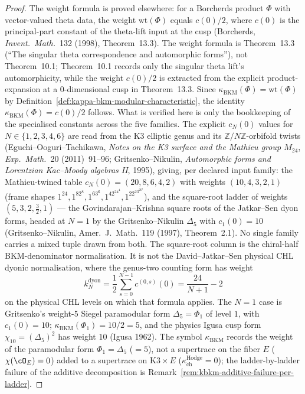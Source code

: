 \begin{proof}
The weight formula is proved elsewhere: for a Borcherds product
$\Phi$ with vector-valued theta data, the weight $\mathrm{wt}(\Phi)$
equals $c(0)/2$, where $c(0)$ is the principal-part constant of the
theta-lift input at the cusp (Borcherds, \emph{Invent.\ Math.}~132
(1998), Theorem~13.3). The weight formula is Theorem~13.3 (``The
singular theta correspondence and automorphic forms''), not
Theorem~10.1; Theorem~10.1 records only the singular theta lift's
automorphicity, while the weight $c(0)/2$ is extracted from the
explicit product-expansion at a $0$-dimensional cusp in Theorem~13.3.
Since $\kappa_{\mathrm{BKM}}(\Phi) = \mathrm{wt}(\Phi)$ by
Definition~\ref{def:kappa-bkm-modular-characteristic}, the identity
$\kappa_{\mathrm{BKM}}(\Phi) = c(0)/2$ follows. What is verified
here is only the bookkeeping of the specialised constants across the
five families. The explicit $c_N(0)$ values for
$N \in \{1, 2, 3, 4, 6\}$ are read from the K$3$ elliptic genus and its
$\mathbb{Z}/N\mathbb{Z}$-orbifold twists (Eguchi--Ooguri--Tachikawa,
\emph{Notes on the K3 surface and the Mathieu group $M_{24}$},
\emph{Exp.\ Math.}~20 (2011)~91--96; Gritsenko--Nikulin,
\emph{Automorphic forms and Lorentzian Kac--Moody algebras II}, 1995),
giving, per declared input family: the Mathieu-twined table
$c_N(0) = (20, 8, 6, 4, 2)$ with weights $(10, 4, 3, 2, 1)$ (frame
shapes $1^{24}, 1^82^8, 1^63^6, 1^42^24^4, 1^22^23^26^2$), and the
square-root ladder of weights $(5, 3, 2, \tfrac32, 1)$ --- the
Govindarajan--Krishna square roots of the Jatkar--Sen dyon forms,
headed at $N = 1$ by the Gritsenko--Nikulin $\Delta_5$ with
$c_1(0) = 10$ (Gritsenko--Nikulin, Amer.~J.~Math.~119 (1997),
Theorem~2.1). No single family carries a mixed tuple drawn from both.
The square-root column is the chiral-half BKM-denominator
normalisation. It is not the
David--Jatkar--Sen physical CHL dyonic normalisation, where the
genus-two counting form has weight
\[
 k_N^{\mathrm{dyon}}
 = \frac12\sum_{s=0}^{N-1} c^{(0,s)}(0)
 = \frac{24}{N+1}-2
\]
on the physical CHL levels on which that formula applies.
The $N = 1$ case is Gritsenko's weight-$5$ Siegel
paramodular form $\Delta_5 = \Phi_1$ of level $1$, with $c_1(0) = 10$;
$\kappa_{\mathrm{BKM}}(\Phi_1) = 10/2 = 5$, and the physics Igusa cusp
form $\chi_{10} = (\Delta_5)^2$ has weight $10$ (Igusa 1962). The
symbol $\kappa_{\mathrm{BKM}}$
records the weight of the paramodular form $\Phi_1 = \Delta_5$
($= 5$), not a supertrace on the fiber $E$ ($\chi(\cO_E) = 0$) added
to a supertrace on $\mathrm{K3} \times E$
($\kappa_{\mathrm{ch}}^{\mathrm{Hodge}} = 0$); the ladder-by-ladder
failure of the additive decomposition is
Remark~\ref{rem:kbkm-additive-failure-per-ladder}.


\end{proof}
